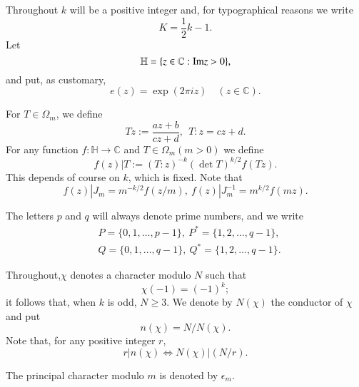 Throughout $k$ will be a positive integer and, for typographical reasons we write
\begin{equation}
K=\frac{1}{2} k -1.\label{art10-eq2.7}
\end{equation}
Let
\begin{equation}
\mathbb{H}=\{z\in \mathbb{C} : \operatorname{Im\textit{z}}>0\},\label{art10-eq2.8}
\end{equation}
and put, as customary,
\begin{equation}
e(z)=\exp (2\pi iz)\quad (z\in \mathbb{C}).\label{art10-eq2.9}
\end{equation}

For $T\in \Omega_{m}$, we define
\begin{equation}
Tz:=\dfrac{az+b}{cz+d}, \ \ T:z=cz+d.\label{art10-eq2.10}
\end{equation}
For any function $f:\mathbb{H}\to \mathbb{C}$ and $T\in \Omega_{m}(m>0)$ we define
\begin{equation}
f(z)|T:=(T:z)^{-k}(\det T)^{k/2}f(Tz).\label{art10-eq2.11}
\end{equation}
This depends of course on $k$, which is fixed. Note that
\begin{equation}
f(z) | J_{m}=m^{-k/2}f(z/m), \ f(z) | J_{m}^{-1}=m^{k/2}f(mz).\label{art10-eq2.12}
\end{equation}

The letters $p$ and $q$ will always denote prime numbers, and we write
\begin{align}
& P=\{0,1,\ldots,p-1\}, \ P^{*}=\{1,2,\ldots,q-1\},\label{art10-eq2.13}\\[2pt]
& Q=\{0,1,\ldots,q-1\}, \ Q^{*}=\{1,2,\ldots,q-1\}.
\end{align}

Throughout,\pageoriginale $\chi$ denotes a character modulo $N$ such that
\begin{equation}
\chi(-1)=(-1)^{k};\label{art10-eq2.15}
\end{equation}
it follows that, when $k$ is odd, $N\geq 3$. We denote by $N(\chi)$ the conductor of $\chi$ and put
\begin{equation}
n(\chi)=N/N(\chi).\label{art10-eq2.16}
\end{equation}
Note that, for any positive integer $r$,
\begin{equation}
r|n(\chi)\Leftrightarrow N(\chi)| (N/r).\label{art10-eq2.17}
\end{equation}

The principal character modulo $m$ is denoted by $\epsilon_{m}$.

